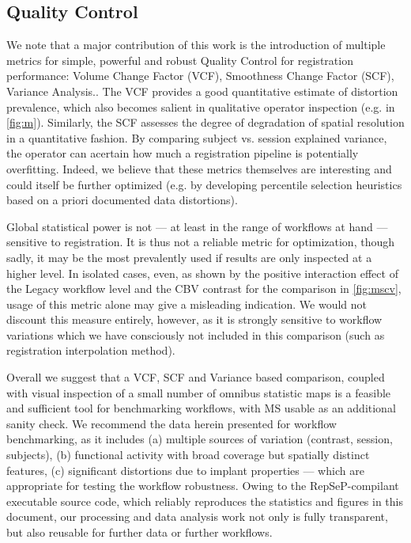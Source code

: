 \subsection{Quality Control}

We note that a major contribution of this work is the introduction of multiple metrics for simple, powerful and robust Quality Control for registration performance:  Volume Change Factor (VCF), Smoothness Change Factor (SCF), Variance Analysis..
The VCF provides a good quantitative estimate of distortion prevalence, which also becomes salient in qualitative operator inspection (e.g. in \cref{fig:m}). Similarly, the SCF assesses the degree of degradation of spatial resolution in a quantitative fashion. By comparing subject vs. session explained variance, the operator can acertain how much a registration pipeline is potentially overfitting.
Indeed, we believe that these metrics themselves are interesting and could itself be further optimized (e.g. by developing percentile selection heuristics based on a priori documented data distortions).

Global statistical power is not --- at least in the range of workflows at hand --- sensitive to registration.
It is thus not a reliable metric for optimization, though sadly, it may be the most prevalently used if results are only inspected at a higher level.
In isolated cases, even, as shown by the positive interaction effect of the Legacy workflow level and the CBV contrast for the comparison in \cref{fig:mscv}, usage of this metric alone may give a misleading indication.
We would not discount this measure entirely, however, as it is strongly sensitive to workflow variations which we have consciously not included in this comparison (such as registration interpolation method).

Overall we suggest that a VCF, SCF and Variance based comparison, coupled with visual inspection of a small number of omnibus statistic maps is a feasible and sufficient tool for benchmarking workflows, with MS usable as an additional sanity check.
We recommend the data herein presented for workflow benchmarking, as it includes (a) multiple sources of variation (contrast, session, subjects), (b) functional activity with broad coverage but spatially distinct features, (c) significant distortions due to implant properties --- which are appropriate for testing the workflow robustness.
Owing to the RepSeP-compilant executable source code, which reliably reproduces the statistics and figures in this document, our processing and data analysis work not only is fully transparent, but also reusable for further data or further workflows.

